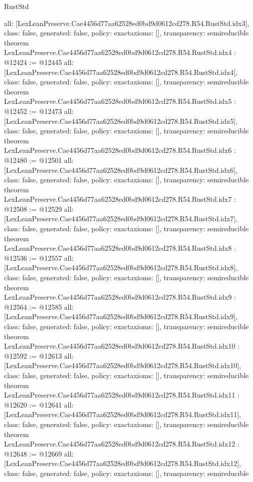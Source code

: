 \begin{lexlean}{RustStd}
\begin{coremodule}
{  all: [LexLeanPreserve.Cae4456d77aa62528ed0bd9d0612cd278.R54.RustStd.idx3],
  class: false,
  generated: false,
  policy: exact{axioms: []},
  transparency: semireducible
}
theorem LexLeanPreserve.Cae4456d77aa62528ed0bd9d0612cd278.R54.RustStd.idx4 : @12424 := @12445 {
  all: [LexLeanPreserve.Cae4456d77aa62528ed0bd9d0612cd278.R54.RustStd.idx4],
  class: false,
  generated: false,
  policy: exact{axioms: []},
  transparency: semireducible
}
theorem LexLeanPreserve.Cae4456d77aa62528ed0bd9d0612cd278.R54.RustStd.idx5 : @12452 := @12473 {
  all: [LexLeanPreserve.Cae4456d77aa62528ed0bd9d0612cd278.R54.RustStd.idx5],
  class: false,
  generated: false,
  policy: exact{axioms: []},
  transparency: semireducible
}
theorem LexLeanPreserve.Cae4456d77aa62528ed0bd9d0612cd278.R54.RustStd.idx6 : @12480 := @12501 {
  all: [LexLeanPreserve.Cae4456d77aa62528ed0bd9d0612cd278.R54.RustStd.idx6],
  class: false,
  generated: false,
  policy: exact{axioms: []},
  transparency: semireducible
}
theorem LexLeanPreserve.Cae4456d77aa62528ed0bd9d0612cd278.R54.RustStd.idx7 : @12508 := @12529 {
  all: [LexLeanPreserve.Cae4456d77aa62528ed0bd9d0612cd278.R54.RustStd.idx7],
  class: false,
  generated: false,
  policy: exact{axioms: []},
  transparency: semireducible
}
theorem LexLeanPreserve.Cae4456d77aa62528ed0bd9d0612cd278.R54.RustStd.idx8 : @12536 := @12557 {
  all: [LexLeanPreserve.Cae4456d77aa62528ed0bd9d0612cd278.R54.RustStd.idx8],
  class: false,
  generated: false,
  policy: exact{axioms: []},
  transparency: semireducible
}
theorem LexLeanPreserve.Cae4456d77aa62528ed0bd9d0612cd278.R54.RustStd.idx9 : @12564 := @12585 {
  all: [LexLeanPreserve.Cae4456d77aa62528ed0bd9d0612cd278.R54.RustStd.idx9],
  class: false,
  generated: false,
  policy: exact{axioms: []},
  transparency: semireducible
}
theorem LexLeanPreserve.Cae4456d77aa62528ed0bd9d0612cd278.R54.RustStd.idx10 : @12592 := @12613 {
  all: [LexLeanPreserve.Cae4456d77aa62528ed0bd9d0612cd278.R54.RustStd.idx10],
  class: false,
  generated: false,
  policy: exact{axioms: []},
  transparency: semireducible
}
theorem LexLeanPreserve.Cae4456d77aa62528ed0bd9d0612cd278.R54.RustStd.idx11 : @12620 := @12641 {
  all: [LexLeanPreserve.Cae4456d77aa62528ed0bd9d0612cd278.R54.RustStd.idx11],
  class: false,
  generated: false,
  policy: exact{axioms: []},
  transparency: semireducible
}
theorem LexLeanPreserve.Cae4456d77aa62528ed0bd9d0612cd278.R54.RustStd.idx12 : @12648 := @12669 {
  all: [LexLeanPreserve.Cae4456d77aa62528ed0bd9d0612cd278.R54.RustStd.idx12],
  class: false,
  generated: false,
  policy: exact{axioms: []},
  transparency: semireducible
}
\end{coremodule}
\end{lexlean}
